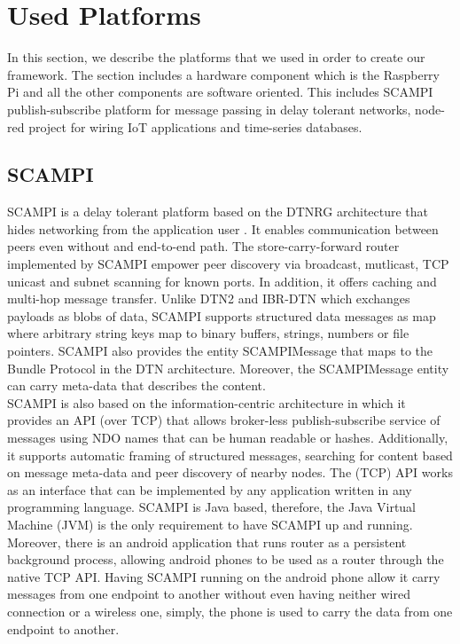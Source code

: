 \section{Used Platforms}
In this section, we describe the platforms that we used in order to create our framework. The section includes a hardware component which is the Raspberry Pi and all the other components are software oriented. This includes SCAMPI publish-subscribe platform for message passing in delay tolerant networks, node-red project for wiring IoT applications and time-series databases.
\newpage
\subsection{SCAMPI}
SCAMPI is a delay tolerant platform based on the DTNRG architecture that hides networking from the application user \cite{Karkkainen:2012:SAP:2348616.2348636}. It enables communication between peers even without and end-to-end path. The store-carry-forward router implemented by SCAMPI empower peer discovery via broadcast, mutlicast, TCP unicast  and subnet scanning for known ports. In addition, it offers caching and multi-hop message transfer. Unlike DTN2 and IBR-DTN which exchanges payloads as blobs of data, SCAMPI supports structured data messages as map where arbitrary string keys map to binary buffers, strings, numbers or file pointers. SCAMPI also provides the entity SCAMPIMessage that maps to the Bundle Protocol in the DTN architecture. Moreover, the SCAMPIMessage entity can carry meta-data that describes the content. \\

\noindent SCAMPI is also based on the information-centric architecture in which it provides an API (over TCP) that allows broker-less publish-subscribe service of messages using NDO names that can be human readable or hashes. Additionally, it supports automatic framing of structured messages, searching for content based on message meta-data and peer discovery of nearby nodes. The (TCP) API works as an interface that can be implemented by any application written in any programming language. SCAMPI is Java based, therefore, the Java Virtual Machine (JVM) is the only requirement to have SCAMPI up and running. Moreover, there is an android application that runs router as a persistent background process, allowing android phones to be used as a router through the native TCP API. Having SCAMPI running on the android phone allow it carry messages from one endpoint to another without even having neither wired connection or a wireless one, simply, the phone is used to carry the data from one endpoint to another. \\

